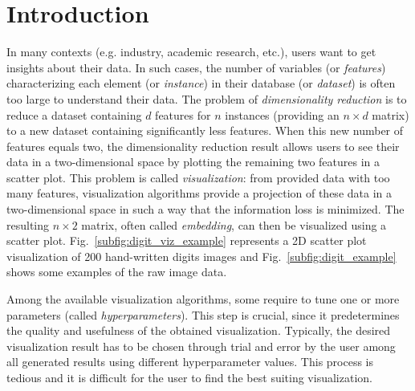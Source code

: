 \section{Introduction}
In many contexts (e.g. industry, academic research, etc.), users want to get insights about their data. In such cases, the number of variables (or \emph{features}) characterizing each element (or \emph{instance}) in their database (or \emph{dataset}) is often too large to understand their data. The problem of {\it dimensionality reduction} is to reduce a dataset containing $d$ features for $n$ instances (providing an $n \times d$ matrix) to a new dataset containing significantly less features. When this new number of features equals two, the dimensionality reduction result allows users to see their data in a two-dimensional space by plotting the remaining two features in a scatter plot. This problem is called {\it visualization}: from provided data with too many features, visualization algorithms provide a projection of these data in a two-dimensional space in such a way that the information loss is minimized. The resulting $n \times 2$ matrix, often called {\it embedding}, can then be visualized using a scatter plot.
Fig.~\ref{subfig:digit_viz_example} represents a 2D scatter plot visualization of 200 hand-written digits images and Fig.~\ref{subfig:digit_example} shows some examples of the raw image data.


Among the available visualization algorithms, some require to tune one or more parameters (called {\it hyperparameters}). This step is crucial, since it predetermines the quality and usefulness of the obtained visualization. Typically, the desired visualization result has to be chosen through trial and error by the user among all generated results using different hyperparameter values. This process is tedious and it is difficult for the user to find the best suiting visualization.

